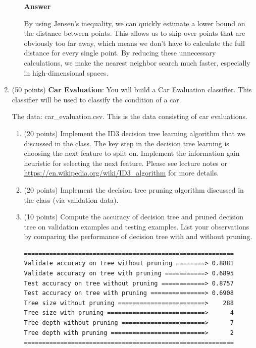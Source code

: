 \documentclass[11pt]{article}
\begin{document}
\begin{enumerate}
\begin{enumerate}
\textbf{Answer}

By using Jensen's inequality, we can quickly estimate a lower bound on the distance between points. This allows us to skip over points that are obviously too far away, which means we don't have to calculate the full distance for every single point. By reducing these unnecessary calculations, we make the nearest neighbor search much faster, especially in high-dimensional spaces.

\end{enumerate}

\item (50 points) \textbf{Car Evaluation}: You will
build a Car Evaluation classifier. This classifier will be
used to classify the condition of a car.

The data: car\_evaluation.csv. This is the data
consisting of car evaluations. 

\begin{enumerate}
\item (20 points) Implement the ID3 decision tree learning
algorithm that we discussed in the class. The key step in the
decision tree learning is choosing the next feature to split on.
Implement the information gain heuristic for selecting the next
feature. Please see lecture notes or
\url{https://en.wikipedia.org/wiki/ID3_algorithm} for more
details.

\item (20 points) Implement the decision tree pruning algorithm
discussed in the class (via validation data).

\item (10 points) Compute the accuracy of decision tree and
pruned decision tree on validation examples and testing examples.
List your observations by comparing the performance of decision
tree with and without pruning.

\begin{adjustwidth}{2cm}{2cm}
\begin{verbatim}
==========================================================
Validate accuracy on tree without pruning ========> 0.8881
Validate accuracy on tree with pruning ===========> 0.6895
Test accuracy on tree without pruning ============> 0.8757
Test accuracy on tree with pruning ===============> 0.6908
Tree size without pruning ========================>    288
Tree size with pruning ===========================>      4
Tree depth without pruning =======================>      7
Tree depth with pruning ==========================>      2
==========================================================
\end{verbatim}
\end{adjustwidth}
\end{enumerate}


\end{enumerate}
\end{document}
